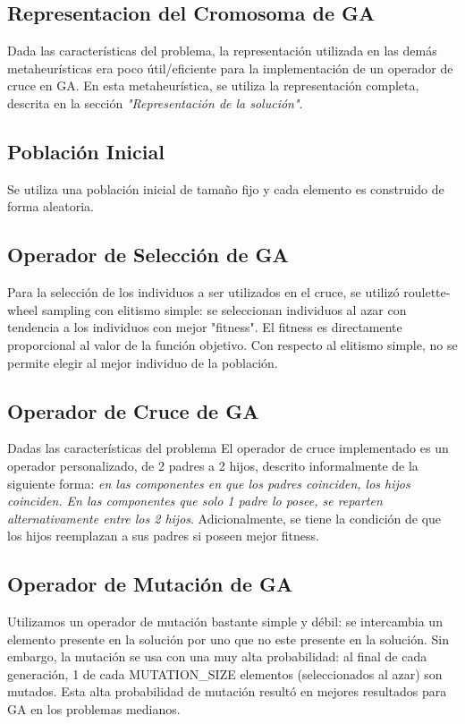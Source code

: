\documentclass{ci5652}
\begin{document}
\subsection{Representacion del Cromosoma de GA}
Dada las características del problema, la representación utilizada en las demás metaheurísticas era poco útil/eficiente para la implementación de un operador de cruce en GA. En esta metaheurística, se utiliza la representación completa, descrita en la sección \textit{"Representación de la solución"}.

\subsection{Población Inicial}
Se utiliza una población inicial de tamaño fijo y cada elemento es construido de forma aleatoria.

\subsection{Operador de Selección de GA}
Para la selección de los individuos a ser utilizados en el cruce, se utilizó roulette-wheel sampling con elitismo simple: se seleccionan individuos al azar con tendencia a los individuos con mejor "fitness". El fitness es directamente proporcional al valor de la función objetivo. Con respecto al elitismo simple, no se permite elegir al mejor individuo de la población.

\subsection{Operador de Cruce de GA}
Dadas las características del problema El operador de cruce implementado es un operador personalizado, de 2 padres a 2 hijos, descrito informalmente de la siguiente forma: \textit{en las componentes en que los padres coinciden, los hijos coinciden. En las componentes que solo 1 padre lo posee, se reparten alternativamente entre los 2 hijos}. Adicionalmente, se tiene la condición de que los hijos reemplazan a sus padres si poseen mejor fitness.

\subsection{Operador de Mutación de GA}
Utilizamos un operador de mutación bastante simple y débil: se intercambia un elemento presente en la solución por uno que no este presente en la solución. Sin embargo, la mutación se usa con una muy alta probabilidad: al final de cada generación, 1 de cada MUTATION\_SIZE elementos (seleccionados al azar) son mutados. Esta alta probabilidad de mutación resultó en mejores resultados para GA en los problemas medianos.
\end{document}

